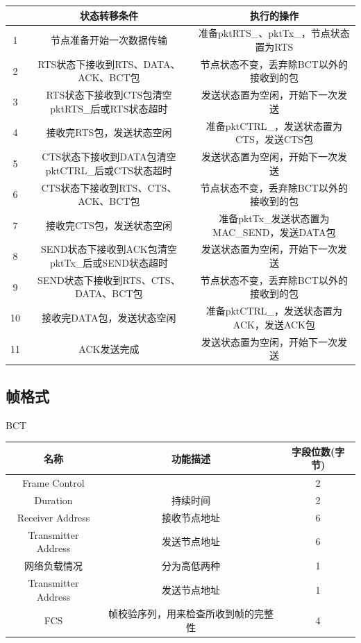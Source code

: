 \begin{table}[!ht]
	\centering
	\begin{tabular}{c c c}
		\hline  %
		&状态转移条件&执行的操作\\
		\hline  %
		1&节点准备开始一次数据传输 &准备pktRTS\_、pktTx\_，节点状态置为RTS\\
		2&RTS状态下接收到RTS、DATA、ACK、BCT包&节点状态不变，丢弃除BCT以外的接收到的包\\
		3&RTS状态下接收到CTS包清空pktRTS\_后或RTS状态超时&发送状态置为空闲，开始下一次发送\\
		4&接收完RTS包，发送状态空闲&准备pktCTRL\_，发送状态置为CTS，发送CTS包\\
		5&CTS状态下接收到DATA包清空pktCTRL\_后或CTS状态超时&发送状态置为空闲，开始下一次发送\\
		6&CTS状态下接收到RTS、CTS、ACK、BCT包&节点状态不变，丢弃除BCT以外的接收到的包\\
		7&接收完CTS包，发送状态空闲&准备pktTx\_发送状态置为MAC\_SEND，发送DATA包\\
		8&SEND状态下接收到ACK包清空pktTx\_后或SEND状态超时&发送状态置为空闲，开始下一次发送\\
		9&SEND状态下接收到RTS、CTS、DATA、BCT包&节点状态不变，丢弃除BCT以外的接收到的包\\
		10&接收完DATA包，发送状态空闲&准备pktCTRL\_，发送状态置为ACK，发送ACK包\\
		11&ACK发送完成&发送状态置为空闲，开始下一次发送\\
		\hline
	\end{tabular}
\end{table}

\subsection{帧格式}
BCT\\
\begin{tabular}{|c|c|c|}%
	\hline  %
	名称&功能描述&字段位数(字节)\\
	\hline  %
	Frame Control& &2\\
	\hline %
	Duration&持续时间&2\\
	\hline
	Receiver Address&接收节点地址&6\\
	\hline
	Transmitter Address&发送节点地址&6\\
	\hline
	网络负载情况&分为高低两种&1\\
	\hline
	Transmitter Address&发送节点地址&1\\
	\hline
	FCS&帧校验序列，用来检查所收到帧的完整性&4\\
	\hline
\end{tabular}

